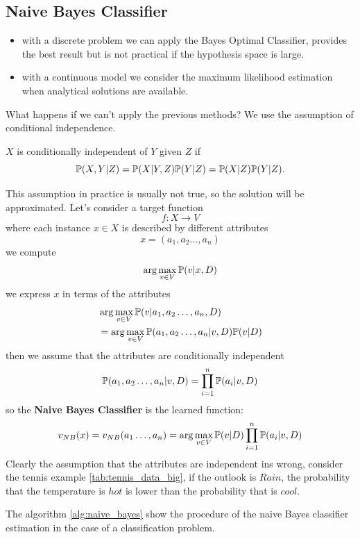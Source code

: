 \documentclass[10pt, letterpaper]{report}
\begin{document}
\subsection{Naive Bayes Classifier}
\begin{itemize}
	\item with a discrete problem we can apply the Bayes Optimal Classifier, provides the best result but is not practical if the hypothesis space is large.
	\item with a continuous model we consider the maximum likelihood estimation when analytical solutions are available.
\end{itemize}
What happens if we can't apply the previous methods? We use the assumption of conditional independence.\begin{definition}
	$X$ is conditionally independent of $Y$ given $Z$ if\begin{equation}
		{\mathbb P}(X, Y|Z)= {\mathbb P}(X|Y,Z){\mathbb P}(Y|Z)={\mathbb P}(X|Z){\mathbb P}(Y|Z).
	\end{equation}
\end{definition}
This assumption in practice is usually not true, so the solution will be approximated.
Let's consider a target function $$f:X\rightarrow V $$ where each instance $x\in X$ is described by different attributes $$x=(a_1,a_2\dots, a_n)$$
we compute\begin{equation}
	\arg\max_{v\in V}{\mathbb P}(v|x,D)
\end{equation}
we express $x$ in terms of the attributes\begin{align}
	 & \arg\max_{v\in V}{\mathbb P}(v|a_1,a_2\dots, a_n,D)            \\
	 & =\arg\max_{v\in V}{\mathbb P}(a_1,a_2\dots, a_n|v,D){\mathbb P}(v|D)
\end{align}
then we assume that the attributes are conditionally independent\begin{equation}
	{\mathbb P}(a_1,a_2\dots, a_n|v,D)=\prod_{i=1}^{n} {\mathbb P}(a_i|v,D)
\end{equation}
so the \textbf{Naive Bayes Classifier} is the learned function:\begin{equation}
	v_{NB}(x)=v_{NB}(a_1\dots, a_n)=\arg\max_{v\in V}{\mathbb P}(v|D)\prod_{i=1}^{n} {\mathbb P}(a_i|v,D)
\end{equation}
Clearly the assumption that the attributes are independent ins wrong, consider the tennis example \ref{tab:tennis_data_big}, if the outlook is $Rain$, the probability that the temperature is $hot$ is lower than the probability that is $cool$.\bigskip

The algorithm \ref{alg:naive_bayes} show the procedure of the naive Bayes classifier estimation in the case of a classification problem.\bigskip
\end{document}
